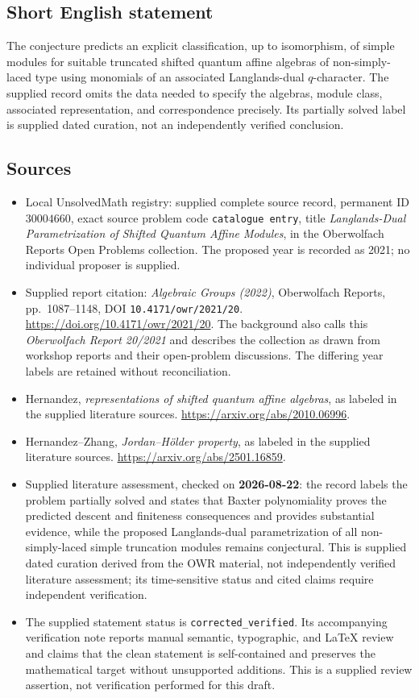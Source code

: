 \documentclass[11pt]{article}
\begin{document}
\subsection{Short English statement}
The conjecture predicts an explicit classification, up to isomorphism, of simple modules for suitable truncated shifted quantum affine algebras of non-simply-laced type using monomials of an associated Langlands-dual \(q\)-character. The supplied record omits the data needed to specify the algebras, module class, associated representation, and correspondence precisely. Its partially solved label is supplied dated curation, not an independently verified conclusion.
\subsection{Sources}
\begin{itemize}
\item Local UnsolvedMath registry: supplied complete source record, permanent ID \(30004660\), exact source problem code \texttt{catalogue entry}, title \emph{Langlands-Dual Parametrization of Shifted Quantum Affine Modules}, in the Oberwolfach Reports Open Problems collection. The proposed year is recorded as 2021; no individual proposer is supplied.
\item Supplied report citation: \emph{Algebraic Groups (2022)}, Oberwolfach Reports, pp.\ 1087--1148, DOI \texttt{10.4171/owr/2021/20}. \url{https://doi.org/10.4171/owr/2021/20}. The background also calls this \emph{Oberwolfach Report 20/2021} and describes the collection as drawn from workshop reports and their open-problem discussions. The differing year labels are retained without reconciliation.
\item Hernandez, \emph{representations of shifted quantum affine algebras}, as labeled in the supplied literature sources. \url{https://arxiv.org/abs/2010.06996}.
\item Hernandez--Zhang, \emph{Jordan--Hölder property}, as labeled in the supplied literature sources. \url{https://arxiv.org/abs/2501.16859}.
\item Supplied literature assessment, checked on \textbf{2026-08-22}: the record labels the problem partially solved and states that Baxter polynomiality proves the predicted descent and finiteness consequences and provides substantial evidence, while the proposed Langlands-dual parametrization of all non-simply-laced simple truncation modules remains conjectural. This is supplied dated curation derived from the OWR material, not independently verified literature assessment; its time-sensitive status and cited claims require independent verification.
\item The supplied statement status is \texttt{corrected\_verified}. Its accompanying verification note reports manual semantic, typographic, and LaTeX review and claims that the clean statement is self-contained and preserves the mathematical target without unsupported additions. This is a supplied review assertion, not verification performed for this draft.
\end{itemize}
\end{document}
